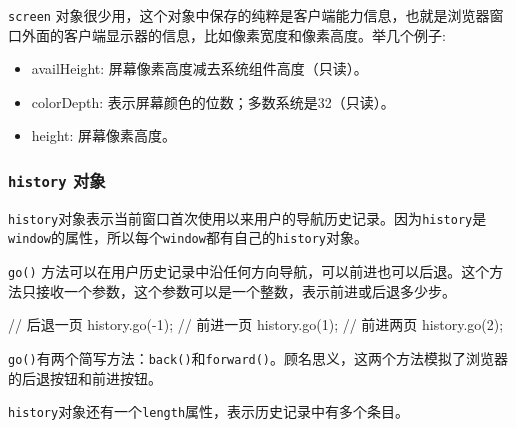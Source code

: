 \texttt{screen} 对象很少用，这个对象中保存的纯粹是客户端能力信息，也就是浏览器窗口外面的客户端显示器的信息，比如像素宽度和像素高度。举几个例子:

\begin{itemize}
    \item availHeight: 屏幕像素高度减去系统组件高度（只读）。
    \item colorDepth: 表示屏幕颜色的位数；多数系统是32（只读）。
    \item height: 屏幕像素高度。
\end{itemize}

\subsubsection*{\texttt{history} 对象}

\texttt{history}对象表示当前窗口首次使用以来用户的导航历史记录。因为\texttt{history}是\texttt{window}的属性，所以每个\texttt{window}都有自己的\texttt{history}对象。

\texttt{go()} 方法可以在用户历史记录中沿任何方向导航，可以前进也可以后退。这个方法只接收一个参数，这个参数可以是一个整数，表示前进或后退多少步。

\begin{JavaScript}
// 后退一页
history.go(-1); 
// 前进一页
history.go(1); 
// 前进两页
history.go(2); 
\end{JavaScript}

\texttt{go()}有两个简写方法：\texttt{back()}和\texttt{forward()}。顾名思义，这两个方法模拟了浏览器的后退按钮和前进按钮。

\texttt{history}对象还有一个\texttt{length}属性，表示历史记录中有多个条目。

\newpage